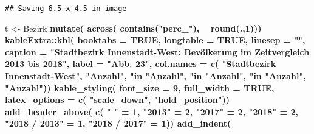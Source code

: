 \documentclass[
  a4paper,
  twoside]{article}
\newenvironment{Shaded}{\begin{snugshade}}{\end{snugshade}}
\newcommand{\DataTypeTok}[1]{\textcolor[rgb]{0.13,0.29,0.53}{#1}}
\newcommand{\DecValTok}[1]{\textcolor[rgb]{0.00,0.00,0.81}{#1}}
\newcommand{\KeywordTok}[1]{\textcolor[rgb]{0.13,0.29,0.53}{\textbf{#1}}}
\newcommand{\NormalTok}[1]{#1}
\newcommand{\OperatorTok}[1]{\textcolor[rgb]{0.81,0.36,0.00}{\textbf{#1}}}
\newcommand{\OtherTok}[1]{\textcolor[rgb]{0.56,0.35,0.01}{#1}}
\newcommand{\StringTok}[1]{\textcolor[rgb]{0.31,0.60,0.02}{#1}}
\begin{document}
\begin{verbatim}
## Saving 6.5 x 4.5 in image
\end{verbatim}

\begin{Shaded}
\begin{Highlighting}[]
\NormalTok{t <-}\StringTok{ }\NormalTok{Bezirk }\OperatorTok{%>%}\StringTok{ }
\StringTok{  }\KeywordTok{mutate}\NormalTok{(}
    \KeywordTok{across}\NormalTok{(}
      \KeywordTok{contains}\NormalTok{(}\StringTok{"perc_"}\NormalTok{),}
      \OperatorTok{~}\StringTok{ }\KeywordTok{round}\NormalTok{(.,}\DecValTok{1}\NormalTok{))) }\OperatorTok{%>%}\StringTok{ }
\StringTok{  }\NormalTok{kableExtra}\OperatorTok{::}\KeywordTok{kbl}\NormalTok{(}
    \DataTypeTok{booktabs =} \OtherTok{TRUE}\NormalTok{,}
    \DataTypeTok{longtable =} \OtherTok{TRUE}\NormalTok{,}
    \DataTypeTok{linesep =} \StringTok{""}\NormalTok{,}
    \DataTypeTok{caption =} \StringTok{"Stadtbezirk Innenstadt-West: Bevölkerung im Zeitvergleich 2013 bis 2018"}\NormalTok{,}
    \DataTypeTok{label =} \StringTok{"Abb. 23"}\NormalTok{,}
    \DataTypeTok{col.names =} \KeywordTok{c}\NormalTok{(}
      \StringTok{"Stadtbezirk Innenstadt-West"}\NormalTok{,}
      \StringTok{"Anzahl"}\NormalTok{,}
      \StringTok{"in % der HWB"}\NormalTok{,}
      \StringTok{"Anzahl"}\NormalTok{,}
      \StringTok{"in % der HWB"}\NormalTok{,}
      \StringTok{"Anzahl"}\NormalTok{,}
      \StringTok{"in % der HWB"}\NormalTok{,}
      \StringTok{"Anzahl"}\NormalTok{,}
      \StringTok{"Anzahl"}\NormalTok{)) }\OperatorTok{%>%}\StringTok{ }
\StringTok{  }\KeywordTok{kable_styling}\NormalTok{(}
    \DataTypeTok{font_size =} \DecValTok{9}\NormalTok{,}
    \DataTypeTok{full_width =} \OtherTok{TRUE}\NormalTok{,}
    \DataTypeTok{latex_options =} \KeywordTok{c}\NormalTok{(}
      \StringTok{"scale_down"}\NormalTok{,}
      \StringTok{"hold_position"}\NormalTok{)) }\OperatorTok{%>%}\StringTok{ }
\StringTok{  }\KeywordTok{add_header_above}\NormalTok{(}
    \KeywordTok{c}\NormalTok{(}
      \StringTok{" "}\NormalTok{ =}\StringTok{ }\DecValTok{1}\NormalTok{,}
      \StringTok{"2013"}\NormalTok{ =}\StringTok{ }\DecValTok{2}\NormalTok{,}
      \StringTok{"2017"}\NormalTok{ =}\StringTok{ }\DecValTok{2}\NormalTok{,}
      \StringTok{"2018"}\NormalTok{ =}\StringTok{ }\DecValTok{2}\NormalTok{,}
      \StringTok{"2018 / 2013"}\NormalTok{ =}\StringTok{ }\DecValTok{1}\NormalTok{,}
      \StringTok{"2018 / 2017"}\NormalTok{ =}\StringTok{ }\DecValTok{1}\NormalTok{)) }\OperatorTok{%>%}\StringTok{ }
\StringTok{  }\KeywordTok{add_indent}\NormalTok{(}
}}}}}}}}
\end{Highlighting}
\end{Shaded}
\end{document}
